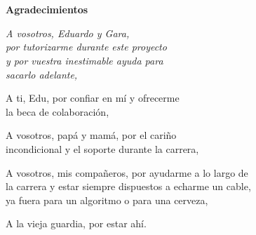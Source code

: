 
\chapter*{}
\begin{flushright}
    {\Huge\textbf{Agradecimientos}}
    \bigskip
    \bigskip

    {\itshape
        A vosotros, Eduardo y Gara, \\ 
        por tutorizarme durante este proyecto \\
        y por vuestra inestimable ayuda para \\
        sacarlo adelante,
        \bigskip
        
        A ti, Edu, por confiar en mí y ofrecerme \\
        la beca de colaboración,
        \bigskip
        
        A vosotros, papá y mamá, por el cariño \\ 
        incondicional y el soporte durante la carrera,
        \bigskip
        
        A vosotros, mis compañeros, por ayudarme a lo largo de \\
        la carrera y estar siempre dispuestos a echarme un cable, \\
        ya fuera para un algoritmo o para una cerveza,
        \bigskip

        A la vieja guardia, por estar ahí. \\
    }
\end{flushright}
